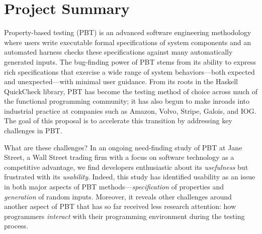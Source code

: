 \section*{Project Summary}


\newcommand{\summarysection}[1]{\medskip \noindent {\bf #1.}}


\summarysection{Overview}
Property-based testing (PBT) is an advanced software engineering
methodology where users write executable formal specifications of system
components
and an automated harness checks these specifications against
many automatically generated inputs.  The bug-finding power of PBT
stems from its ability to express rich specifications that
exercise a wide range of system behaviors---both
expected and unexpected---with minimal user guidance.
%
From its roots in the Haskell QuickCheck library, PBT has become
the testing method of choice across much of the functional programming
community; it has also begun to make inroads into industrial practice
at companies such as Amazon, Volvo, Stripe, Galois, and IOG.
%
The goal of this proposal is to accelerate this transition
by addressing key challenges in
PBT.

What are these challenges? \iflater{}\fi
In an ongoing need-finding study of PBT at Jane
Street, a Wall Street trading firm with a focus on software
technology as a competitive advantage, we find developers enthusiastic
about its {\em usefulness} but frustrated with its {\em usability}.
%
Indeed, this study has identified usability as an issue in both major aspects
of PBT methods---{\em specification} of properties and {\em
  generation} of random inputs. Moreover, it reveals other challenges
around another aspect of PBT that has so far received less research
attention: how programmers {\em interact} with their programming
environment during the testing process.

